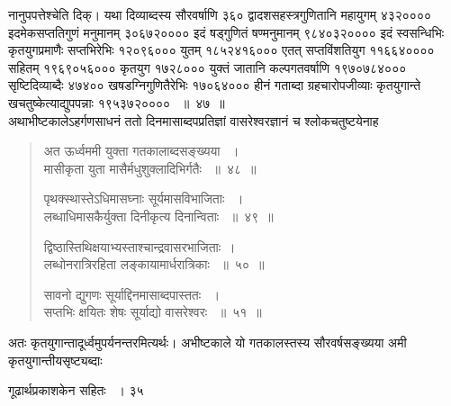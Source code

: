 \documentclass[11pt, openany]{book}
\begin{document}
\begin{sloppypar}
\noindent नानुपपत्तेश्चेति दिक्। यथा दिव्याब्दस्य सौरवर्षाणि ३६० द्वादशसहस्त्रगुणितानि महायुगम् ४३२०००० इदमेकसप्ततिगुणं मनुमानम् ३०६७२०००० इदं षड्गुणितं षण्मनुमानम् ९८४०३२०००० इदं स्वसन्धिभिः कृतयुगप्रमाणैः सप्तभिरेभिः १२०९६००० युतम् १८५२४१६००० एतत् सप्तविंशतियुग ११६६४०००० सहितम् १९६९०५६००० कृतयुग १७२८००० युक्तं जातानि कल्पगतवर्षाणि १९७०७८४००० सृष्टिदिव्याब्दैः ४७४०० खषडग्निगुणितैरेभिः १७०६४००० हीनं गताब्दा ग्रहचारोपजीव्याः कृतयुगान्ते खचतुष्केत्याद्युपपन्नाः १९५३७२०००० ~॥~४७~॥\\ 
\noindent अथाभीष्टकालेऽहर्गणसाधनं ततो दिनमासाब्दपप्रतिज्ञां वासरेश्वरज्ञानं च श्लोकचतुष्टयेनाह\textendash
\end{sloppypar}
\begin{quote}

 {\ssi अत ऊर्ध्वममी युक्ता गतकालाब्दसङ्ख्यया ~।\\
मासीकृता युता मासैर्मधुशुक्लादिभिर्गतैः ~॥~४८~॥

पृथक्स्थास्तेऽधिमासघ्नाः सूर्यमासविभाजिताः ~।\\
लब्धाधिमासकैर्युक्ता दिनीकृत्य दिनान्विताः ~॥~४९~॥

द्विष्ठास्तिथिक्षयाभ्यस्ताश्चान्द्रवासरभाजिताः~।\\
लब्धोनरात्रिरहिता लङ्कायामार्धरात्रिकाः ~॥~५०~॥

सावनो द्युगणः सूर्याद्दिनमासाब्दपास्ततः ~।\\
सप्तभिः क्षयितः शेषः सूर्याद्यो वासरेश्वरः ~॥~५१~॥}
\end{quote}
 \begin{sloppypar}
 अतः कृतयुगान्तादूर्ध्वमुपर्यनन्तरमित्यर्थः। अभीष्टकाले यो गतकालस्तस्य सौरवर्षसङ्ख्यया अमी कृतयुगान्तीयसृष्ट्यब्दाः
\end{sloppypar}

\newpage

\hspace{3cm} गूढार्थप्रकाशकेन सहितः ~। \hfill ३५
\vspace{1cm}
\end{document}
